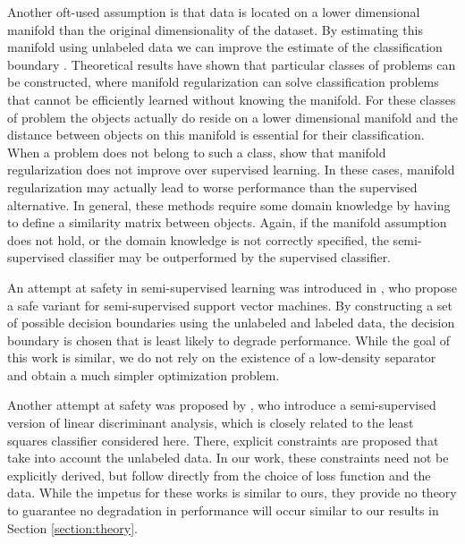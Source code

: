 \documentclass[smallcondensed]{svjour3}\usepackage[]{graphicx}\usepackage[]{color}
\begin{document}
Another oft-used assumption is that data is located on a lower dimensional manifold than the original dimensionality of the dataset. By estimating this manifold using unlabeled data we can improve the estimate of the classification boundary \citep{Zhu2003}. Theoretical results have shown that particular classes of problems can be constructed, where manifold regularization can solve classification problems \citep{Niyogi2013} that cannot be efficiently learned without knowing the manifold. For these classes of problem the objects actually do reside on a lower dimensional manifold and the distance between objects on this manifold is essential for their classification. When a problem does not belong to such a class, \citet{Lafferty2007} show that manifold regularization does not improve over supervised learning. In these cases, manifold regularization may actually lead to worse performance than the supervised alternative. In general, these methods require some domain knowledge by having to define a similarity matrix between objects. Again, if the manifold assumption does not hold, or the domain knowledge is not correctly specified, the semi-supervised classifier may be outperformed by the supervised classifier.

An attempt at safety in semi-supervised learning was introduced in \citet{Li2011}, who propose a safe variant for semi-supervised support vector machines. By constructing a set of possible decision boundaries using the unlabeled and labeled data, the decision boundary is chosen that is least likely to degrade performance. While the goal of this work is similar, we do not rely on the existence of a low-density separator and obtain a much simpler optimization problem. 

Another attempt at safety was proposed by \citet{Loog2010,Loog2014a}, who introduce a semi-supervised version of linear discriminant analysis, which is closely related to the least squares classifier considered here. There, explicit constraints are proposed that take into account the unlabeled data. In our work, these constraints need not be explicitly derived, but follow  directly from the choice of loss function and the data. While the impetus for these works is similar to ours, they provide no theory to guarantee no degradation in performance will occur similar to our results in Section \ref{section:theory}.
\end{document}
